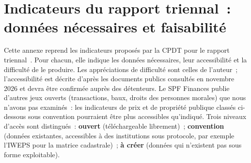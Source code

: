 \documentclass[11pt,a4paper]{report}
\begin{document}
\chapter[Indicateurs du rapport triennal]{Indicateurs du rapport triennal~: données nécessaires et faisabilité}
\label{ann:indicateurs}
Cette annexe reprend les indicateurs proposés par la CPDT pour le rapport triennal~\citep{cpdt_monitoring2025}. Pour chacun, elle indique les données nécessaires, leur accessibilité et la difficulté de le produire. Les appréciations de difficulté sont celles de l'auteur~; l'accessibilité est décrite d'après les documents publics consultés en novembre 2026 et devra être confirmée auprès des détenteurs. Le SPF Finances publie d'autres jeux ouverts (transactions, baux, droits des personnes morales) que nous n'avons pas examinés~: les indicateurs de prix et de propriété publique classés ci-dessous sous convention pourraient être plus accessibles qu'indiqué. Trois niveaux d'accès sont distingués~: \textbf{ouvert} (téléchargeable librement)~; \textbf{convention} (données existantes, accessibles à des institutions sous protocole, par exemple l'IWEPS pour la matrice cadastrale)~; \textbf{à créer} (données qui n'existent pas sous forme exploitable).
\end{document}
